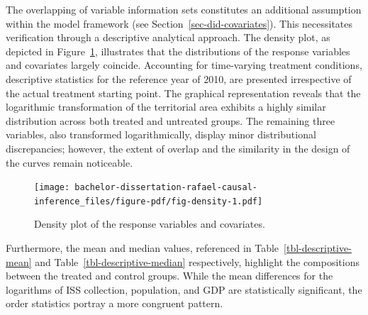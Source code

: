 \documentclass[12pt, a4paper, twoside]{article}
\numberwithin{equation}{subsection} %
\begin{document}
The overlapping of variable information sets constitutes an additional
assumption within the model framework (see
Section~\ref{sec-did-covariates}). This necessitates verification
through a descriptive analytical approach. The density plot, as depicted
in Figure~\ref{fig-density}, illustrates that the distributions of the
response variables and covariates largely coincide. Accounting for
time-varying treatment conditions, descriptive statistics for the
reference year of 2010, are presented irrespective of the actual
treatment starting point. The graphical representation reveals that the
logarithmic transformation of the territorial area exhibits a highly
similar distribution across both treated and untreated groups. The
remaining three variables, also transformed logarithmically, display
minor distributional discrepancies; however, the extent of overlap and
the similarity in the design of the curves remain noticeable.

\begin{figure}[H]

{\centering \texttt{[image: bachelor-dissertation-rafael-causal-inference\_files/figure-pdf/fig-density-1.pdf]}

}

\caption{\label{fig-density}Density plot of the response variables and
covariates.}

\end{figure}

Furthermore, the mean and median values, referenced in
Table~\ref{tbl-descriptive-mean} and Table~\ref{tbl-descriptive-median}
respectively, highlight the compositions between the treated and control
groups. While the mean differences for the logarithms of ISS collection,
population, and GDP are statistically significant, the order statistics
portray a more congruent pattern.
\end{document}
